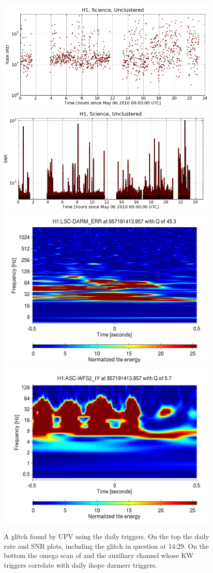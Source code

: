 \begin{figure}
  \includegraphics[width=0.5\linewidth]{figures/detchar/20100506_H1_0_UNCLUSTERED_rate_vs_time}
  \includegraphics[width=0.5\linewidth]{figures/detchar/20100506_H1_0_UNCLUSTERED_snr_vs_time} \\
  \includegraphics[width=0.5\linewidth]{figures/detchar/957191413_957191417_H1_LSC-DARM_ERR_1_00_spectrogram_whitened}
  \includegraphics[width=0.5\linewidth]{figures/detchar/957191413_957191417_H1_ASC-WFS2_IY_1_00_spectrogram_whitened}
  \caption[Glitch found by UPV using the daily triggers]{
  \label{f:daily_upv}
A glitch found by UPV using the daily triggers.  On the top the daily
rate and SNR plots, including the glitch in question at 14:29.  On the
bottom the omega scan of \darmerr and the auxiliary channel whose KW
triggers correlate with daily ihope darmerr triggers.}
\end{figure}%


